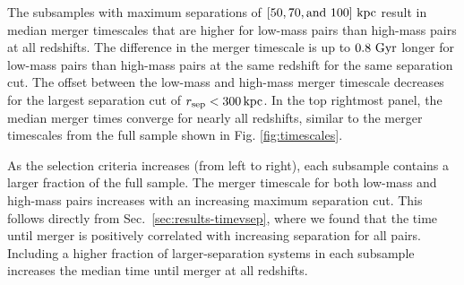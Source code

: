 \documentclass[twocolumn,linenumbers]{aastex631}
\begin{document}
        
        The subsamples with maximum separations of $[50, 70, \mbox{and } 100]\,\mathrm{\,kpc}$ result in median merger timescales that are higher for low-mass pairs than high-mass pairs at all redshifts. 
        The difference in the merger timescale is up to $0.8\,\mathrm{\,Gyr}$ longer for low-mass pairs than high-mass pairs at the same redshift for the same separation cut. 
        The offset between the low-mass and high-mass merger timescale decreases for the largest separation cut of $r_{\mathrm{sep}}<300\mathrm{\,kpc}$. 
        In the top rightmost panel, the median merger times converge for nearly all redshifts, similar to the merger timescales from the full sample shown in Fig. \ref{fig:timescales}.
        
        As the selection criteria increases (from left to right), each subsample contains a larger fraction of the full sample.
        The merger timescale for both low-mass and high-mass pairs increases with an increasing maximum separation cut.  
        This follows directly from Sec.~\ref{sec:results-timevsep}, where we found that the time until merger is positively correlated with increasing separation for all pairs. 
        Including a higher fraction of larger-separation systems in each subsample increases the median time until merger at all redshifts. 
        
\end{document}
